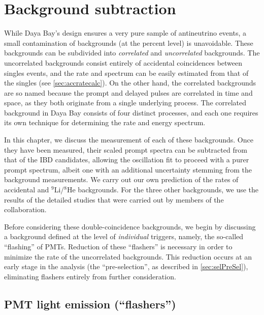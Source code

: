 \documentclass[../thesis.tex]{subfiles}
\begin{document}
\chapter{Background subtraction}
\label{chap:bkg}

While Daya Bay's design ensures a very pure sample of antineutrino events, a small contamination of backgrounds (at the percent level) is unavoidable. These backgrounds can be subdivided into \emph{correlated} and \emph{uncorrelated} backgrounds. The uncorrelated backgrounds consist entirely of accidental coincidences between singles events, and the rate and spectrum can be easily estimated from that of the singles (see \autoref{sec:accratecalc}). On the other hand, the correlated backgrounds are so named because the prompt and delayed pulses are correlated in time and space, as they both originate from a single underlying process. The correlated background in Daya Bay consists of four distinct processes, and each one requires its own technique for determining the rate and energy spectrum.

In this chapter, we discuss the measurement of each of these backgrounds. Once they have been measured, their scaled prompt spectra can be subtracted from that of the IBD candidates, allowing the oscillation fit to proceed with a purer prompt spectrum, albeit one with an additional uncertainty stemming from the background measurements. We carry out our own prediction of the rates of accidental and $^9$Li/$^8$He backgrounds. For the three other backgrounds, we use the results of the detailed studies that were carried out by members of the collaboration.

Before considering these double-coincidence backgrounds, we begin by discussing a background defined at the level of \emph{individual} triggers, namely, the so-called ``flashing'' of PMTs. Reduction of these ``flashers'' is necessary in order to minimize the rate of the uncorrelated backgrounds. This reduction occurs at an early stage in the analysis (the ``pre-selection'', as described in \autoref{sec:selPreSel}), eliminating flashers entirely from further consideration.

\section{PMT light emission (``flashers'')}
\label{sec:bkgFlashers}
\end{document}
